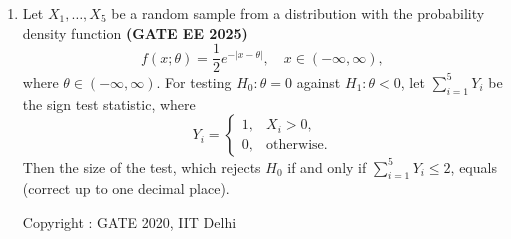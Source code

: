 \documentclass[journal,12pt,onecolumn]{IEEEtran}
\theoremstyle{remark}
\begin{document}
\begin{enumerate}
\item Let $X_1, \ldots, X_5$ be a random sample from a distribution with the probability density function
\hfill \textbf{(GATE EE 2025)}
\[ 
f(x;\theta) = \frac{1}{2} e^{-|x-\theta|}, \quad x \in (-\infty,\infty),
\]
where $\theta \in (-\infty,\infty)$. For testing $H_0: \theta = 0$ against $H_1: \theta < 0$, let $\sum_{i=1}^5 Y_i$ be the sign test statistic, where 
\[
Y_i = \begin{cases}
1, & X_i > 0, \\
0, & \text{otherwise}.
\end{cases}
\]
Then the size of the test, which rejects $H_0$ if and only if $\sum_{i=1}^5 Y_i \leq 2$, equals \underline{\hspace{3cm}} (correct up to one decimal place).

\vfill
\begin{center}
Copyright : GATE 2020, IIT Delhi
\end{center}
\end{enumerate}
\end{document}
